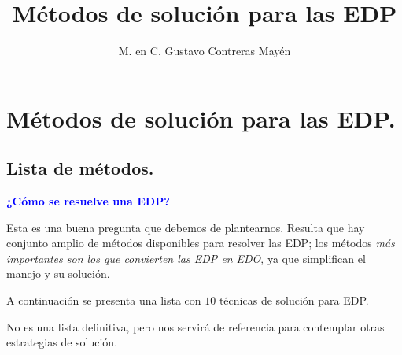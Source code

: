 
\title{Métodos de solución para las EDP} \vspace{-3ex}
\author{M. en C. Gustavo Contreras Mayén}
\date{ }
\newcommand{\Cancel}[2][black]{{\color{#1}\cancel{\color{black}#2}}}

\vspace{-4cm}
\maketitle
\fontsize{14}{14}\selectfont
\tableofcontents
\newpage

\section{Métodos de solución para las EDP.}
\subsection{Lista de métodos.}

\textcolor{blue}{\textbf{¿Cómo se resuelve una EDP?}}
\par
Esta es una buena pregunta que debemos de plantearnos. Resulta que hay conjunto amplio de métodos disponibles para resolver las EDP; los métodos \emph{más importantes son los que convierten las EDP en EDO}, ya que simplifican el manejo y su solución.
\par
A continuación se presenta una lista con $10$ técnicas de solución para EDP.

No es una lista definitiva, pero nos servirá de referencia para contemplar otras estrategias de solución.

